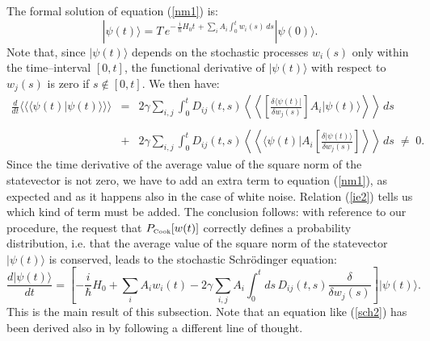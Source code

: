 \documentclass[10pt,a4paper]{article}
\newcommand{\llangle}{\langle\!\langle}
\newcommand{\rrangle}{\rangle\!\rangle}
\newcommand{\LLangle}{\left\langle\!\!\!\left\langle}
\newcommand{\RRangle}{\right\rangle\!\!\!\right\rangle}
\begin{document}
The formal solution of equation (\ref{nm1}) is:
\begin{equation} \label{fs}
|\psi(t)\rangle = T\, e^{\displaystyle -\, \frac{i}{\hbar}H_{0}
t\, + \sum_{i} A_{i} \int_{0}^{t} w_{i}(s)\, ds }|\psi(0)\rangle.
\end{equation}
Note that, since $|\psi(t)\rangle$ depends on the stochastic
processes $w_{i}(s)$ only within the time--interval $[0,t]$, the
functional derivative of $|\psi(t)\rangle$ with respect to
$w_{j}(s)$ is zero if $s \not\in [0,t]$. We then have:
\begin{eqnarray} \label{ie2}
\frac{d}{dt}\llangle\langle\psi(t)|\psi(t)\rangle\rrangle & = &
2\gamma \sum_{i,j} \int_{0}^{t} D_{ij}(t,s) \LLangle \left[
\frac{\delta \langle\psi(t)|}{\delta w_{j}(s)}\right]
A_{i}|\psi(t)\rangle\RRangle \,ds \nonumber \\ &  &  \\ & + &
2\gamma \sum_{i,j} \int_{0}^{t} D_{ij}(t,s) \LLangle
\langle\psi(t)|A_{i} \left[ \frac{\delta |\psi(t)\rangle}{\delta
w_{j}(s)} \right]\RRangle \, ds \; \neq \; 0. \nonumber
\end{eqnarray}
Since the time derivative of the average value of the square norm
of the statevector is not zero, we have to add an extra term to
equation (\ref{nm1}), as expected and as it happens also in the
case of white noise. Relation (\ref{ie2}) tells us which kind of
term must be added. The conclusion follows: with reference to our
procedure, the request that $P_{\makebox{\tiny Cook}}[w(t)]$
correctly defines a probability distribution, i.e. that the
average value of the square norm of the statevector
$|\psi(t)\rangle$ is conserved, leads to the stochastic
Schr\"odinger equation:
\begin{equation}\label{sch2}
\frac{d|\psi(t)\rangle}{dt} =  \left[ -\frac{i}{\hbar} H_{0} +
\sum_{i} A_{i} w_{i}(t) - 2\gamma \sum_{i,j}A_{i} \int_{0}^{t}
ds\, D_{ij}(t,s) \frac{\delta}{\delta w_{j}(s)} \right]
|\psi(t)\rangle.
\end{equation}
This is the main result of this subsection. Note that an equation
like (\ref{sch2}) has been derived also in \cite{gi2wq, bud} by
following a different line of thought.
\end{document}
